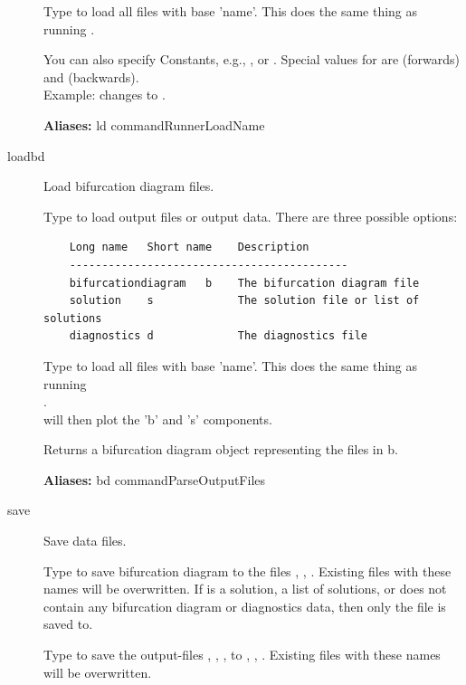 \documentclass[12pt]{report}
\begin{document}
\begin{description}
    Type  to load all files with base 'name'.
    This does the same thing as running
    .
 
    You can also specify \AUTO Constants, e.g., , or .
    Special values for  are  (forwards) and  (backwards).\\
    Example:  changes  to .

    \textbf{Aliases:} ld commandRunnerLoadName

\item[loadbd]
    Load bifurcation diagram files.

    Type  to load output files or output data.
    There are three possible options:
    \begin{verbatim}
    Long name   Short name    Description
    -------------------------------------------
    bifurcationdiagram   b    The bifurcation diagram file
    solution    s             The solution file or list of solutions
    diagnostics d             The diagnostics file
    \end{verbatim}

    Type  to load all files with base 'name'.
    This does the same thing as running\\
    .\\
     will then plot the 'b' and 's' components.

    Returns a bifurcation diagram object representing the files in b.

    \textbf{Aliases:} bd commandParseOutputFiles

\item[save]
Save data files.

    Type  to save bifurcation diagram 
    to the files , , . 
    Existing files with these names will be overwritten.
    If  is a solution, a list of solutions, or does not contain any
    bifurcation diagram or diagnostics data, then only the file 
    is saved to.

    Type  to save the output-files ,
    , , to , ,
    . Existing files with these names will be overwritten.


\end{description}
\end{document}
